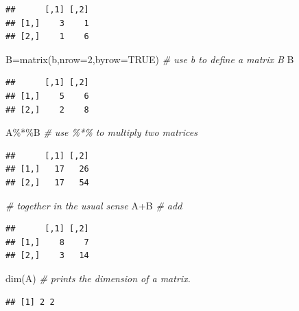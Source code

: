 \documentclass[
]{book}
\newenvironment{Shaded}{\begin{snugshade}}{\end{snugshade}}
\newcommand{\AttributeTok}[1]{\textcolor[rgb]{0.77,0.63,0.00}{#1}}
\newcommand{\CommentTok}[1]{\textcolor[rgb]{0.56,0.35,0.01}{\textit{#1}}}
\newcommand{\ConstantTok}[1]{\textcolor[rgb]{0.00,0.00,0.00}{#1}}
\newcommand{\DecValTok}[1]{\textcolor[rgb]{0.00,0.00,0.81}{#1}}
\newcommand{\FunctionTok}[1]{\textcolor[rgb]{0.00,0.00,0.00}{#1}}
\newcommand{\NormalTok}[1]{#1}
\newcommand{\OtherTok}[1]{\textcolor[rgb]{0.56,0.35,0.01}{#1}}
\newcommand{\SpecialCharTok}[1]{\textcolor[rgb]{0.00,0.00,0.00}{#1}}
\theoremstyle{definition}
\theoremstyle{definition}
\theoremstyle{definition}
\theoremstyle{definition}
\theoremstyle{remark}
\begin{document}
\begin{verbatim}
##      [,1] [,2]
## [1,]    3    1
## [2,]    1    6
\end{verbatim}

\begin{Shaded}
\begin{Highlighting}[]
\NormalTok{B}\OtherTok{=}\FunctionTok{matrix}\NormalTok{(b,}\AttributeTok{nrow=}\DecValTok{2}\NormalTok{,}\AttributeTok{byrow=}\ConstantTok{TRUE}\NormalTok{)    }\CommentTok{\# use b to define a matrix B}
\NormalTok{B}
\end{Highlighting}
\end{Shaded}

\begin{verbatim}
##      [,1] [,2]
## [1,]    5    6
## [2,]    2    8
\end{verbatim}

\begin{Shaded}
\begin{Highlighting}[]
\NormalTok{A}\SpecialCharTok{\%*\%}\NormalTok{B                            }\CommentTok{\# use \%*\% to multiply two matrices}
\end{Highlighting}
\end{Shaded}

\begin{verbatim}
##      [,1] [,2]
## [1,]   17   26
## [2,]   17   54
\end{verbatim}

\begin{Shaded}
\begin{Highlighting}[]
                                 \CommentTok{\# together in the usual sense}
\NormalTok{A}\SpecialCharTok{+}\NormalTok{B                              }\CommentTok{\# add}
\end{Highlighting}
\end{Shaded}

\begin{verbatim}
##      [,1] [,2]
## [1,]    8    7
## [2,]    3   14
\end{verbatim}

\begin{Shaded}
\begin{Highlighting}[]
\FunctionTok{dim}\NormalTok{(A)                           }\CommentTok{\# prints the dimension of a matrix.}
\end{Highlighting}
\end{Shaded}

\begin{verbatim}
## [1] 2 2
\end{verbatim}
\end{document}

